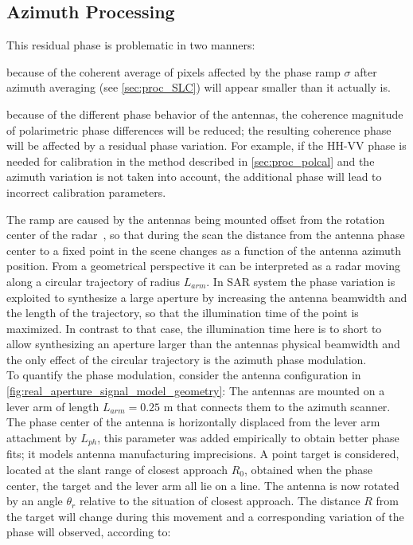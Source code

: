 \subsection{Azimuth Processing}
This residual phase is problematic in two manners: \begin{enumerate*}
	\item because of the coherent average of pixels affected by the phase ramp\label{item:SNR}  $\sigma$ after azimuth averaging (see \autoref{sec:proc_SLC}) will appear smaller than it actually is.
  \item because of the different phase behavior of the antennas, the coherence magnitude of polarimetric phase differences will be reduced; the resulting coherence phase will be affected by a residual phase variation. For example, if the HH-VV phase is needed for calibration in the method described in \autoref{sec:proc_polcal} and the azimuth variation is not taken into account, the additional phase will lead to incorrect calibration parameters.\label{item:phase_variation}\end{enumerate*}
The ramp are caused by the antennas being mounted offset from the rotation center of the  radar~\cite{Lee2014}, so that during the scan the distance from the antenna phase center to a fixed point in the scene changes as a function of the antenna azimuth position. From a geometrical perspective it can be interpreted as a radar moving along a circular trajectory of radius $L_{arm}$. In SAR system the phase variation is exploited to synthesize a large aperture by increasing the antenna beamwidth and the length of the trajectory, so that the illumination time of the point is maximized. In contrast to that case, the illumination time here is to short to allow synthesizing an aperture larger than the antennas physical beamwidth and the only effect of the circular trajectory is the azimuth phase modulation.\\
To quantify the phase modulation, consider the antenna configuration in \autoref{fig:real_aperture_signal_model_geometry}:
The antennas are mounted on a lever arm of length $L_{arm} = 0.25$ m that connects them to the azimuth scanner. The phase center of the antenna is horizontally displaced from the lever arm attachment by $L_{ph}$, this parameter was added empirically to obtain better phase fits; it models antenna manufacturing imprecisions. A point target is considered, located at the slant range  of closest approach $R_{0}$, obtained when the phase center, the target and the lever arm all lie on a line. The antenna is now rotated by an angle $\theta_r$ relative to the situation of closest approach. The distance $R$ from the target will change during this movement and a corresponding variation of the phase will observed, according to:
